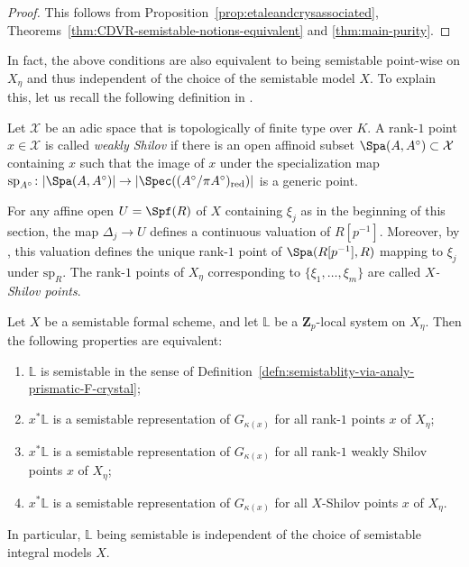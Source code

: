 \begin{proof}
This follows from Proposition~\ref{prop:etaleandcrysassociated}, Theorems~\ref{thm:CDVR-semistable-notions-equivalent} and \ref{thm:main-purity}.    
\end{proof}

In fact, the above conditions are also equivalent to being semistable point-wise on $X_\eta$ and thus independent of the choice of the semistable model $X$. To explain this, let us recall the following definition in \cite{bhatt_hansen-6-functor-rigid}.

\begin{defn}
Let $\mathcal{X}$ be an adic space that is topologically of finite type over $K$. A rank-$1$ point $x\in \mathcal{X}$ is called \emph{weakly Shilov} if there is an open affinoid subset $\Spa(A, A^\circ)\subset \mathcal{X}$ containing $x$ such that the image of $x$ under the specialization map $\mathrm{sp}_{A^\circ}\colon \lvert \Spa(A, A^\circ) \rvert \to \lvert \Spec((A^\circ/\pi A^\circ)_{\mathrm{red}})\rvert$ is a generic point. 
\end{defn}

\begin{rem} \label{rem:Sholiv pts and generic pts}
For any affine open $U=\Spf(R)$ of $X$ containing $\xi_j$ as in the beginning of this section, the map $\Delta_j \to U$ defines a continuous valuation of $R[p^{-1}]$. Moreover, by \cite[Prop.~2.2]{bhatt_hansen-6-functor-rigid}, this valuation defines the unique rank-$1$ point of $\Spa(R[p^{-1}],R)$ mapping to $\xi_j$ under $\mathrm{sp}_{R}$. The rank-$1$ points of $X_\eta$ corresponding to $\{\xi_1,\ldots, \xi_m\}$ are called \emph{$X$-Shilov points}.
\end{rem}


\begin{cor} \label{cor:independent-model}
Let $X$ be a semistable formal scheme, and let $\mathbb{L}$ be a $\mathbf{Z}_p$-local system on $X_{\eta}$. Then the following properties are equivalent:
\begin{enumerate}
    \item $\mathbb{L}$ is semistable in the sense of Definition~\ref{defn:semistablity-via-analy-prismatic-F-crystal};
    \item $x^\ast\mathbb{L}$ is a semistable representation of $G_{\kappa(x)}$ for all rank-$1$ points $x$ of $X_\eta$;
    \item $x^\ast\mathbb{L}$ is a semistable representation of $G_{\kappa(x)}$ for all rank-$1$ weakly Shilov points $x$ of $X_\eta$;
    \item $x^\ast\mathbb{L}$ is a semistable representation of $G_{\kappa(x)}$ for all $X$-Shilov points $x$ of $X_\eta$.
\end{enumerate}
In particular, $\mathbb{L}$ being semistable is independent of the choice of semistable integral models $X$.
\end{cor}

